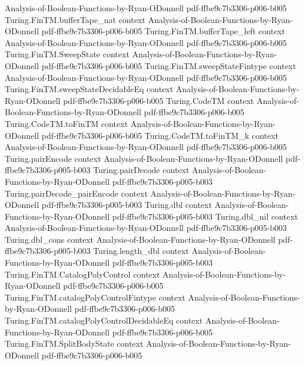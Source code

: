 \begin{lemma}
  {Analysis-of-Boolean-Functions-by-Ryan-ODonnell}
  {pdf-ffbe9c7b3306-p006-b005}
\proofstep
  {Turing.FinTM.bufferTape_nat}
  {context}
  {Analysis-of-Boolean-Functions-by-Ryan-ODonnell}
  {pdf-ffbe9c7b3306-p006-b005}
\proofstep
  {Turing.FinTM.bufferTape_left}
  {context}
  {Analysis-of-Boolean-Functions-by-Ryan-ODonnell}
  {pdf-ffbe9c7b3306-p006-b005}
\proofstep
  {Turing.FinTM.SweepState}
  {context}
  {Analysis-of-Boolean-Functions-by-Ryan-ODonnell}
  {pdf-ffbe9c7b3306-p006-b005}
\proofstep
  {Turing.FinTM.sweepStateFintype}
  {context}
  {Analysis-of-Boolean-Functions-by-Ryan-ODonnell}
  {pdf-ffbe9c7b3306-p006-b005}
\proofstep
  {Turing.FinTM.sweepStateDecidableEq}
  {context}
  {Analysis-of-Boolean-Functions-by-Ryan-ODonnell}
  {pdf-ffbe9c7b3306-p006-b005}
\proofstep
  {Turing.CodeTM}
  {context}
  {Analysis-of-Boolean-Functions-by-Ryan-ODonnell}
  {pdf-ffbe9c7b3306-p006-b005}
\proofstep
  {Turing.CodeTM.toFinTM}
  {context}
  {Analysis-of-Boolean-Functions-by-Ryan-ODonnell}
  {pdf-ffbe9c7b3306-p006-b005}
\proofstep
  {Turing.CodeTM.toFinTM_k}
  {context}
  {Analysis-of-Boolean-Functions-by-Ryan-ODonnell}
  {pdf-ffbe9c7b3306-p006-b005}
\proofstep
  {Turing.pairEncode}
  {context}
  {Analysis-of-Boolean-Functions-by-Ryan-ODonnell}
  {pdf-ffbe9c7b3306-p005-b003}
\proofstep
  {Turing.pairDecode}
  {context}
  {Analysis-of-Boolean-Functions-by-Ryan-ODonnell}
  {pdf-ffbe9c7b3306-p005-b003}
\proofstep
  {Turing.pairDecode_pairEncode}
  {context}
  {Analysis-of-Boolean-Functions-by-Ryan-ODonnell}
  {pdf-ffbe9c7b3306-p005-b003}
\proofstep
  {Turing.dbl}
  {context}
  {Analysis-of-Boolean-Functions-by-Ryan-ODonnell}
  {pdf-ffbe9c7b3306-p005-b003}
\proofstep
  {Turing.dbl_nil}
  {context}
  {Analysis-of-Boolean-Functions-by-Ryan-ODonnell}
  {pdf-ffbe9c7b3306-p005-b003}
\proofstep
  {Turing.dbl_cons}
  {context}
  {Analysis-of-Boolean-Functions-by-Ryan-ODonnell}
  {pdf-ffbe9c7b3306-p005-b003}
\proofstep
  {Turing.length_dbl}
  {context}
  {Analysis-of-Boolean-Functions-by-Ryan-ODonnell}
  {pdf-ffbe9c7b3306-p005-b003}
\proofstep
  {Turing.FinTM.CatalogPolyControl}
  {context}
  {Analysis-of-Boolean-Functions-by-Ryan-ODonnell}
  {pdf-ffbe9c7b3306-p006-b005}
\proofstep
  {Turing.FinTM.catalogPolyControlFintype}
  {context}
  {Analysis-of-Boolean-Functions-by-Ryan-ODonnell}
  {pdf-ffbe9c7b3306-p006-b005}
\proofstep
  {Turing.FinTM.catalogPolyControlDecidableEq}
  {context}
  {Analysis-of-Boolean-Functions-by-Ryan-ODonnell}
  {pdf-ffbe9c7b3306-p006-b005}
\proofstep
  {Turing.FinTM.SplitBodyState}
  {context}
  {Analysis-of-Boolean-Functions-by-Ryan-ODonnell}
  {pdf-ffbe9c7b3306-p006-b005}

\end{lemma}
